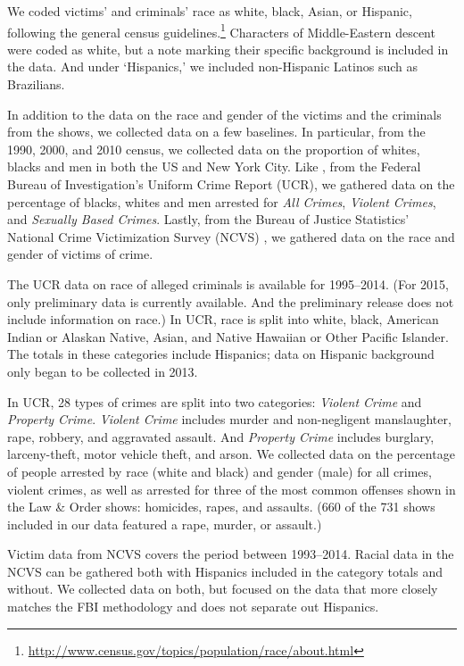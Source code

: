 \documentclass[12pt, letterpaper]{article}
\begin{document}
We coded victims' and criminals' race as white, black, Asian, or Hispanic, following the general census guidelines.\footnote{\url{http://www.census.gov/topics/population/race/about.html}} Characters of Middle-Eastern descent were coded as white, but a note marking their specific background is included in the data. And under `Hispanics,' we included non-Hispanic Latinos such as Brazilians.

In addition to the data on the race and gender of the victims and the criminals from the shows, we collected data on a few baselines. In particular, from the 1990, 2000, and 2010 census, we collected data on the proportion of whites, blacks and men in both the US and New York City. Like \citet{dixon2000overrepresentation}, from the Federal Bureau of Investigation's Uniform Crime Report (UCR), we gathered data on the percentage of blacks, whites and men arrested for \textit{All Crimes}, \textit{Violent Crimes}, and \textit{Sexually Based Crimes}. Lastly, from the Bureau of Justice Statistics' National Crime Victimization Survey (NCVS) \citep{powers2016national, victimization1998national}, we gathered data on the race and gender of victims of crime.  

The UCR data on race of alleged criminals is available for 1995--2014. (For 2015, only preliminary data is currently available. And the preliminary release does not include information on race.) In UCR, race is split into white, black, American Indian or Alaskan Native, Asian, and Native Hawaiian or Other Pacific Islander. The totals in these categories include Hispanics; data on Hispanic background only began to be collected in 2013. 

In UCR, 28 types of crimes are split into two categories: \textit{Violent Crime} and \textit{Property Crime}. \textit{Violent Crime} includes murder and non-negligent manslaughter, rape, robbery, and aggravated assault. And \textit{Property Crime} includes burglary, larceny-theft, motor vehicle theft, and arson. We collected data on the percentage of people arrested by race (white and black) and gender (male) for all crimes, violent crimes, as well as arrested for three of the most common offenses shown in the Law \& Order shows: homicides, rapes, and assaults. (660 of the 731 shows included in our data featured a rape, murder, or assault.)

Victim data from NCVS covers the period between 1993--2014. Racial data in the NCVS can be gathered both with Hispanics included in the category totals and without. We collected data on both, but focused on the data that more closely matches the FBI methodology and does not separate out Hispanics.
\end{document}
